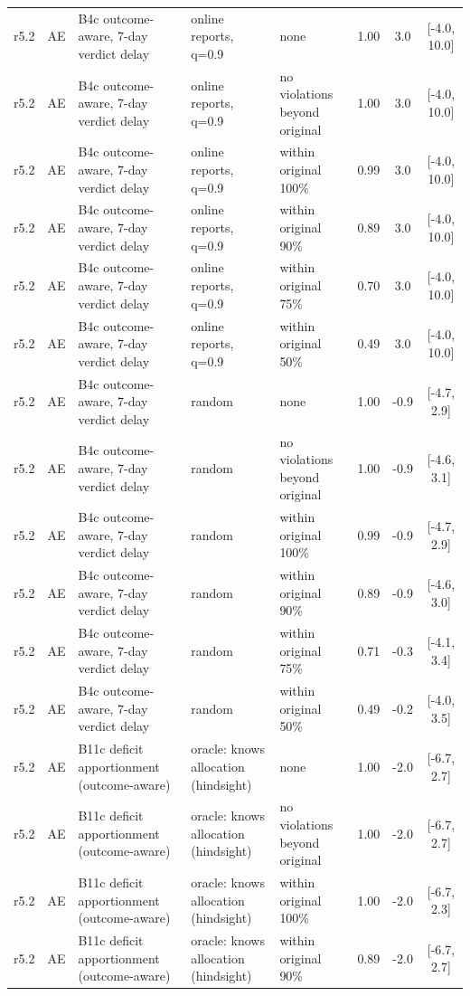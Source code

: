 \begin{longtable}{lllp{4.2cm}p{3.4cm}ccc}
r5.2 & AE & B4c outcome-aware, 7-day verdict delay & online reports, q=0.9 & none & 1.00 & 3.0 & [-4.0, 10.0] \\
r5.2 & AE & B4c outcome-aware, 7-day verdict delay & online reports, q=0.9 & no violations beyond original & 1.00 & 3.0 & [-4.0, 10.0] \\
r5.2 & AE & B4c outcome-aware, 7-day verdict delay & online reports, q=0.9 & within original 100\% & 0.99 & 3.0 & [-4.0, 10.0] \\
r5.2 & AE & B4c outcome-aware, 7-day verdict delay & online reports, q=0.9 & within original 90\% & 0.89 & 3.0 & [-4.0, 10.0] \\
r5.2 & AE & B4c outcome-aware, 7-day verdict delay & online reports, q=0.9 & within original 75\% & 0.70 & 3.0 & [-4.0, 10.0] \\
r5.2 & AE & B4c outcome-aware, 7-day verdict delay & online reports, q=0.9 & within original 50\% & 0.49 & 3.0 & [-4.0, 10.0] \\
r5.2 & AE & B4c outcome-aware, 7-day verdict delay & random & none & 1.00 & -0.9 & [-4.7, 2.9] \\
r5.2 & AE & B4c outcome-aware, 7-day verdict delay & random & no violations beyond original & 1.00 & -0.9 & [-4.6, 3.1] \\
r5.2 & AE & B4c outcome-aware, 7-day verdict delay & random & within original 100\% & 0.99 & -0.9 & [-4.7, 2.9] \\
r5.2 & AE & B4c outcome-aware, 7-day verdict delay & random & within original 90\% & 0.89 & -0.9 & [-4.6, 3.0] \\
r5.2 & AE & B4c outcome-aware, 7-day verdict delay & random & within original 75\% & 0.71 & -0.3 & [-4.1, 3.4] \\
r5.2 & AE & B4c outcome-aware, 7-day verdict delay & random & within original 50\% & 0.49 & -0.2 & [-4.0, 3.5] \\
r5.2 & AE & B11c deficit apportionment (outcome-aware) & oracle: knows allocation (hindsight) & none & 1.00 & -2.0 & [-6.7, 2.7] \\
r5.2 & AE & B11c deficit apportionment (outcome-aware) & oracle: knows allocation (hindsight) & no violations beyond original & 1.00 & -2.0 & [-6.7, 2.7] \\
r5.2 & AE & B11c deficit apportionment (outcome-aware) & oracle: knows allocation (hindsight) & within original 100\% & 1.00 & -2.0 & [-6.7, 2.3] \\
r5.2 & AE & B11c deficit apportionment (outcome-aware) & oracle: knows allocation (hindsight) & within original 90\% & 0.89 & -2.0 & [-6.7, 2.7] \\

\end{longtable}
